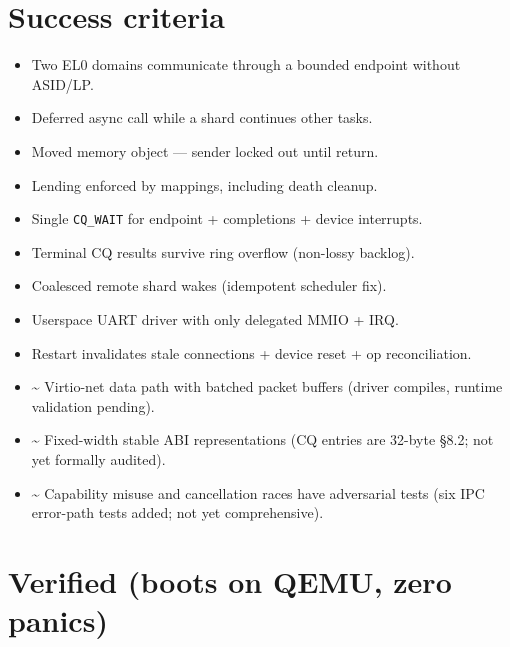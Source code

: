 \section{Success criteria}

\begin{itemize}
    \item[1.] Two EL0 domains communicate through a bounded endpoint
        without ASID/LP.
    \item[2.] Deferred async call while a shard continues other tasks.
    \item[3.] Moved memory object --- sender locked out until return.
    \item[4.] Lending enforced by mappings, including death cleanup.
    \item[5.] Single \texttt{CQ\_WAIT} for endpoint + completions +
        device interrupts.
    \item[6.] Terminal CQ results survive ring overflow (non-lossy
        backlog).
    \item[7.] Coalesced remote shard wakes (idempotent scheduler fix).
    \item[8.] Userspace UART driver with only delegated MMIO + IRQ.
    \item[9.] Restart invalidates stale connections + device reset +
        op reconciliation.
    \item[10.] \textasciitilde{} Virtio-net data path with batched packet
        buffers (driver compiles, runtime validation pending).
    \item[11.] \textasciitilde{} Fixed-width stable ABI representations (CQ
        entries are 32-byte \S8.2; not yet formally audited).
    \item[12.] \textasciitilde{} Capability misuse and cancellation races have
        adversarial tests (six IPC error-path tests added; not yet
        comprehensive).
\end{itemize}

\section{Verified (boots on QEMU, zero panics)}

